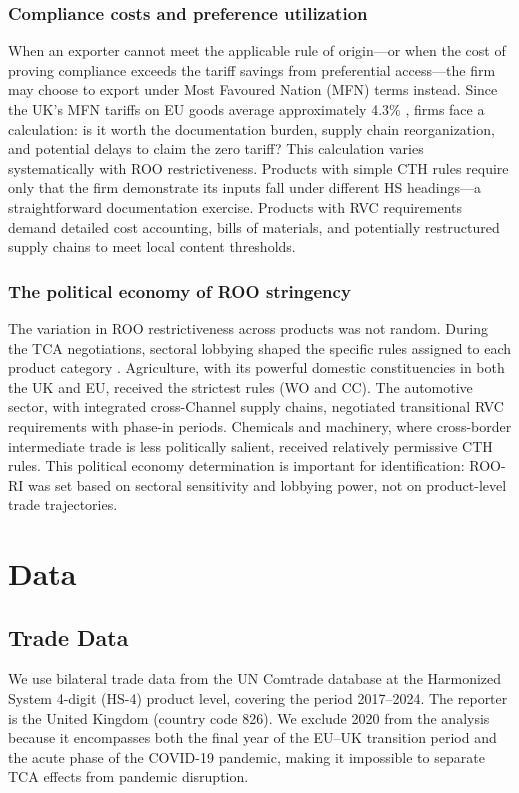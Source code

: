 \documentclass[12pt]{article}
\begin{document}
\subsubsection*{Compliance costs and preference utilization} When an exporter cannot meet the applicable rule of origin---or when the cost of proving compliance exceeds the tariff savings from preferential access---the firm may choose to export under Most Favoured Nation (MFN) terms instead. Since the UK's MFN tariffs on EU goods average approximately 4.3\% \citep{kren2022}, firms face a calculation: is it worth the documentation burden, supply chain reorganization, and potential delays to claim the zero tariff? This calculation varies systematically with ROO restrictiveness. Products with simple CTH rules require only that the firm demonstrate its inputs fall under different HS headings---a straightforward documentation exercise. Products with RVC requirements demand detailed cost accounting, bills of materials, and potentially restructured supply chains to meet local content thresholds.

\subsubsection*{The political economy of ROO stringency} The variation in ROO restrictiveness across products was not random. During the TCA negotiations, sectoral lobbying shaped the specific rules assigned to each product category \citep{gasiorek2022}. Agriculture, with its powerful domestic constituencies in both the UK and EU, received the strictest rules (WO and CC). The automotive sector, with integrated cross-Channel supply chains, negotiated transitional RVC requirements with phase-in periods. Chemicals and machinery, where cross-border intermediate trade is less politically salient, received relatively permissive CTH rules. This political economy determination is important for identification: ROO-RI was set based on sectoral sensitivity and lobbying power, not on product-level trade trajectories.


\section{Data}

\subsection{Trade Data}

We use bilateral trade data from the UN Comtrade database at the Harmonized System 4-digit (HS-4) product level, covering the period 2017--2024. The reporter is the United Kingdom (country code 826). We exclude 2020 from the analysis because it encompasses both the final year of the EU--UK transition period and the acute phase of the COVID-19 pandemic, making it impossible to separate TCA effects from pandemic disruption.
\end{document}
